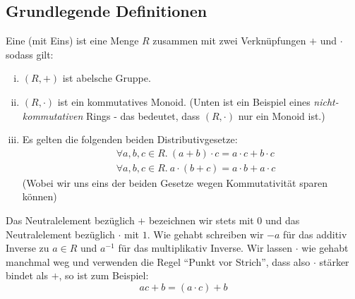 \subsection{Grundlegende Definitionen}

\begin{definition}
  Eine  (mit Eins) ist eine Menge \(R\) zusammen mit zwei Verknüpfungen \(+\) und \(\cdot\) sodass gilt:
  \begin{enumerate}[(i)]
  \item \((R,+)\) ist abelsche Gruppe.
  \item \((R,\cdot)\) ist ein kommutatives Monoid. (Unten ist ein Beispiel eines \emph{nicht-kommutativen} Rings - das bedeutet, dass \((R,\cdot)\) nur ein Monoid ist.)
  \item Es gelten die folgenden beiden Distributivgesetze:
    \begin{align*}
      &\forall a,b,c\in R.~ (a+b)\cdot c =a\cdot c+b\cdot c \\
      &\forall a,b,c\in R.~ a\cdot (b+c)=a\cdot b+a\cdot c
    \end{align*}
    (Wobei wir uns eins der beiden Gesetze wegen Kommutativität sparen können)
  \end{enumerate}
\end{definition}

\begin{konvention}
  Das Neutralelement bezüglich \(+\) bezeichnen wir stets mit \(0\) und das Neutralelement bezüglich \(\cdot\) mit \(1\). Wie gehabt schreiben wir \(-a\) für das additiv Inverse zu \(a\in R\) und \(a^{-1}\) für das multiplikativ Inverse. Wir lassen \(\cdot\) wie gehabt manchmal weg und verwenden die Regel ``Punkt vor Strich'', dass also \(\cdot\) stärker bindet als \(+\), so ist zum Beispiel:
  \[
    ac+b=(a\cdot c)+b
  \]  
\end{konvention}

